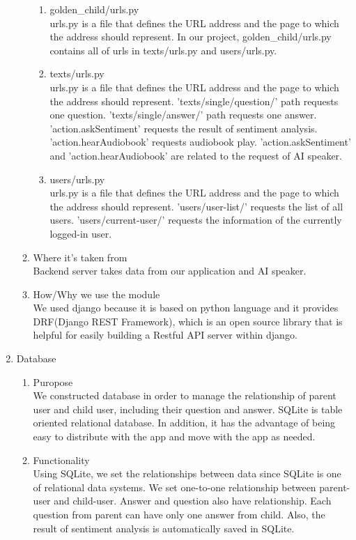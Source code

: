 \documentclass[conference]{IEEEtran}
\begin{document}
\begin{enumerate}
\begin{enumerate}
\begin{enumerate}
            \item golden\_child/urls.py
            \\urls.py is a file that defines the URL address and the page to which the address should represent. In our project, golden\_child/urls.py contains all of urls in texts/urls.py and users/urls.py.  
            \item texts/urls.py
            \\urls.py is a file that defines the URL address and the page to which the address should represent. 'texts/single/question/' path requests one question. 'texts/single/answer/' path requests one answer. 'action.askSentiment' requests the result of sentiment analysis. 'action.hearAudiobook' requests audiobook play. 'action.askSentiment' and 'action.hearAudiobook' are related to the request of AI speaker.
            \item users/urls.py
            \\urls.py is a file that defines the URL address and the page to which the address should represent. 'users/user-list/' requests the list of all users. 'users/current-user/' requests the information of the currently logged-in user.
        \end{enumerate}
        \item Where it’s taken from
        \\Backend server takes data from our application and AI speaker.
        \item How/Why we use the module
        \\We used django because it is based on python language and it provides DRF(Django REST Framework), which is an open source library that is helpful for easily building a Restful API server within django.
        \end{enumerate}
    \item Database
        \begin{enumerate}
            \item Puropose
            \\We constructed database in order to manage the relationship of parent user and child user, including their question and answer. SQLite is table oriented relational database. In addition, it has the advantage of being easy to distribute with the app and move with the app as needed.
            
            \item Functionality
            \\Using SQLite, we set the relationships between data since SQLite is one of relational data systems. We set one-to-one relationship between parent-user and child-user. Answer and question also have relationship. Each question from parent can have only one answer from child. Also, the result of sentiment analysis is automatically saved in SQLite.
            

\end{enumerate}
\end{enumerate}
\end{document}
